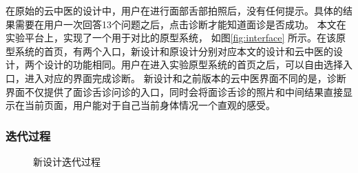 在原始的云中医的设计中，用户在进行面部舌部拍照后，没有任何提示。具体的结果需要在用户一次回答13个问题之后，点击诊断才能知道面诊是否成功。
本文在实验平台上，实现了一个用于对比的原型系统， 如图\ref{fig:interface} 所示。在该原型系统的首页，有两个入口，新设计和原设计分别对应本文的设计和云中医的设计，两个设计的功能相同。用户在进入实验原型系统的首页之后，可以自由选择入口，进入对应的界面完成诊断。
新设计和之前版本的云中医界面不同的是，诊断界面不仅提供了面诊舌诊问诊的入口，同时会将面诊舌诊的照片和中间结果直接显示在当前页面，用户能对于自己当前身体情况一个直观的感受。

\subsubsection{迭代过程}
\begin{figure}[h]
    \centering
    \caption{新设计迭代过程}
    \label{fig:diag_new}
\end{figure}
